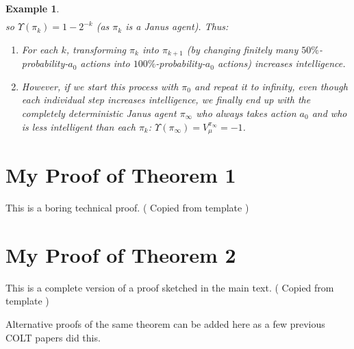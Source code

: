 \documentclass[twoside]{article}
\newtheorem{example}[theorem]{Example}
\begin{document}
\begin{example}
\begin{align*}
    \end{align*}
    so $\Upsilon(\pi_k)=1-2^{-k}$ (as $\pi_k$ is a Janus agent).
    Thus:
    \begin{enumerate}
        \item For each $k$, transforming $\pi_k$ into $\pi_{k+1}$
            (by changing finitely many $50\%$-probability-$a_0$
            actions into $100\%$-probability-$a_0$ actions)
            \emph{increases} intelligence.
        \item However, if we start this process with $\pi_0$ and
            repeat it to infinity, even though each individual step
            \emph{increases} intelligence, we finally end up with
            the completely deterministic
            Janus agent $\pi_{\infty}$ who always takes action $a_0$ and who is
            \emph{less} intelligent than each $\pi_k$:
            $\Upsilon(\pi_{\infty})=V^{\pi_\infty}_\mu=-1$.
    \end{enumerate}
\end{example}



\appendix

\section{My Proof of Theorem 1}

This is a boring technical proof. ( Copied from template )

\section{My Proof of Theorem 2}

This is a complete version of a proof sketched in the main text.
( Copied from template )

 Alternative proofs of the same theorem can be added here as a few previous COLT papers did this.
\end{document}
